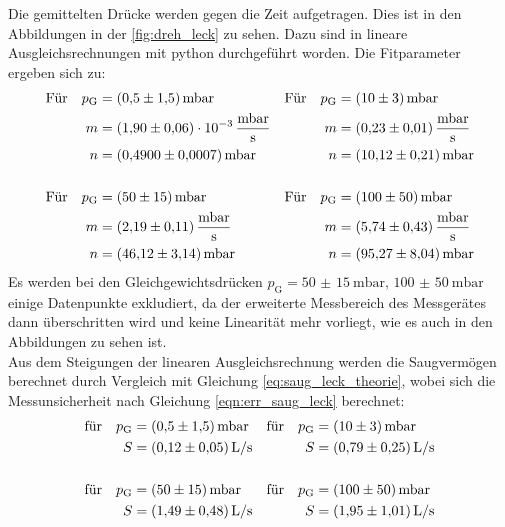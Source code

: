     \noindent Die gemittelten Drücke werden gegen die Zeit aufgetragen. Dies ist in den Abbildungen in der \autoref{fig:dreh_leck} zu sehen. Dazu sind in lineare Ausgleichsrechnungen 
    mit python \cite{scipy} durchgeführt worden. Die Fitparameter ergeben sich zu:
    \begin{align*}
      \text{Für} \quad  p_\text{G} &= \SI{0.5(15)}{\milli\bar}  & \text{Für} \quad  p_\text{G} &= \SI{10(3)}{\milli\bar}\\
      m &= \SI{1.90(6)e-3}{\milli\bar\per\second}           & m &= \SI{0.23 \pm 0.01}{\milli\bar\per\second} \\
      n &= \SI{0.49 \pm 0.0007}{\milli\bar}                 & n &= \SI{10.12 \pm 0.21}{\milli\bar} \\
      \\
      \text{Für} \quad  p_\text{G} &= \SI{50(15)}{\milli\bar}   & \text{Für} \quad  p_\text{G} &= \SI{100(50)}{\milli\bar}\\
      m &= \SI{2.19 \pm 0.11}{\milli\bar\per\second}        & m &= \SI{5.74 \pm 0.43}{\milli\bar\per\second} \\
      n &= \SI{46.12 \pm 3.14}{\milli\bar}                  & n &= \SI{95.27 \pm 8.04}{\milli\bar} 
    \end{align*}
    Es werden bei den Gleichgewichtsdrücken $p_\text{G} = \SI{50(15)}{\milli\bar}, \, \SI{100(50)}{\milli\bar}$ einige Datenpunkte exkludiert, da der erweiterte Messbereich des Messgerätes
    dann überschritten wird und keine Linearität mehr vorliegt, wie es auch in den Abbildungen zu sehen ist. \\
    Aus dem Steigungen der linearen Ausgleichsrechnung werden die Saugvermögen berechnet durch Vergleich mit Gleichung \eqref{eq:saug_leck_theorie}, wobei sich die Messunsicherheit nach Gleichung \eqref{eqn:err_saug_leck} berechnet:
    \begin{align*}
      \text{für} \quad p_\text{G} &= \SI{0.5(15)}{\milli\bar} & \text{für} \quad p_\text{G} &= \SI{10(3)}{\milli\bar} \\
      S &= \SI{0.12 \pm 0.05}{L\per\second}               & S &= \SI{0.79 \pm 0.25}{L\per\second}  \\
      \\
      \text{für} \quad p_\text{G} &= \SI{50(15)}{\milli\bar}  & \text{für} \quad p_\text{G} &= \SI{100(50)}{\milli\bar} \\
      S &= \SI{1.49 \pm 0.48}{L\per\second}               & S &= \SI{1.95 \pm 1.01}{L\per\second}  
    \end{align*}

